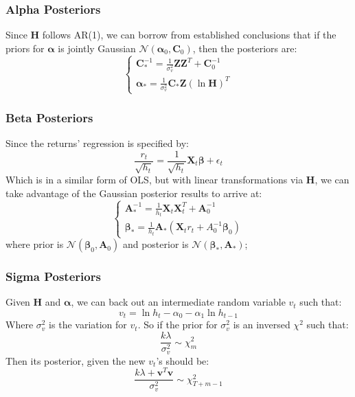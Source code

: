 \documentclass[letterpaper]{article}
\newcommand{\XX}{\mathbf{X}}
\newcommand{\ZZ}{\mathbf{Z}}
\begin{document}
	\subsubsection{Alpha Posteriors}
	Since $\bm{H}$ follows AR(1), we can borrow from established conclusions that if the priors for $\bm{\alpha}$ is jointly Gaussian $\mathcal{N}(\bm{\alpha}_0,\bm{C}_0)$, then the posteriors are:
	\begin{equation}
	\begin{cases}
	\bm{C}_*^{-1}=\frac{1}{\sigma^2_v}\ZZ\ZZ^T+\bm{C}_0^{-1}\\
	\bm{\alpha}_*=\frac{1}{\sigma_v^2}\bm{C}_*\ZZ(\ln\mathbf{H})^T
	\end{cases}
	\end{equation}
	\subsubsection{Beta Posteriors}
	Since the returns' regression is specified by:
	\begin{equation}
		\frac{r_{t}}{\sqrt{h_t}} =\frac{1}{\sqrt{h_t}}\XX_t\bm{\beta}+\epsilon_{t}
	\end{equation}
	Which is in a similar form of OLS, but with linear transformations via $\bm{H}$, we can take advantage of the Gaussian posterior results to arrive at:
	\begin{equation}
		\begin{cases}
			\bm{A}_*^{-1}=\frac{1}{h_t}\XX_t\XX_t^T+\bm{A}_0^{-1}\\
			\bm{\beta}_*=\frac{1}{h_t}\bm{A}_*(\XX_tr_t+A_0^{-1}\bm{\beta}_{0})
		\end{cases}
	\end{equation}
	where prior is $\mathcal{N}(\bm{\beta}_0,\bm{A}_0)$ and posterior is $\mathcal{N}(\bm{\beta}_*,\bm{A}_*)$;
	\subsubsection{Sigma Posteriors}
	Given $\bm{H}$ and $\bm{\alpha}$, we can back out an intermediate random variable $v_t$ such that:
	\begin{equation}
		v_t=\ln h_t-\alpha_{0}-\alpha_{1}\ln h_{t-1}
	\end{equation}
	Where $\sigma_{v}^2$ is the variation for $v_t$. So if the prior for $\sigma_{v}^2$ is an inversed $\chi^2$ such that:
	\begin{equation}
		\frac{k\lambda}{\sigma_{v}^2}\sim\chi^2_m
	\end{equation}
	Then its posterior, given the new $v_t$'s should be:
	\begin{equation}
		\frac{k\lambda+\bm{v}^T\bm{v}}{\sigma_{v}^2}\sim\chi_{T+m-1}^2
	\end{equation}
\end{document}
